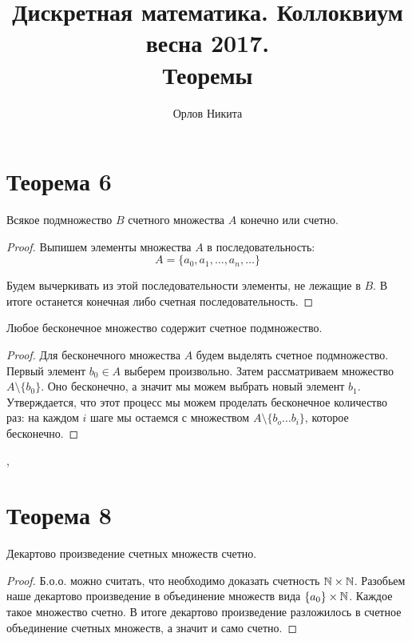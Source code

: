\documentclass[a4paper,12pt]{article}
\begin{document}
	\title{Дискретная математика. Коллоквиум весна 2017. \\ Теоремы}
	\author{Орлов Никита}
	\maketitle
	
	\section*{Теорема 6}
	\begin{theorem}
		Всякое подмножество $B$ счетного множества $A$ конечно или счетно.
	\end{theorem}
	\begin{proof}
		Выпишем элементы множества $A$ в последовательность:
		\[
		A = \{a_0, a_1, \ldots, a_n, \ldots \}
		\]
		
		Будем вычеркивать из этой последовательности элементы, не лежащие в $B$. В итоге останется конечная либо счетная последовательность. 
	\end{proof}

	\begin{theorem}
		Любое бесконечное множество содержит счетное подмножество.
	\end{theorem}
	\begin{proof}
		Для бесконечного множества $A$ будем выделять счетное подмножество. Первый элемент $b_0 \in A$ выберем произвольно. Затем рассматриваем множество $A \setminus \{b_0\}$. Оно бесконечно, а значит мы можем выбрать новый элемент $b_1$. Утверждается, что этот процесс мы можем проделать бесконечное количество раз: на каждом $i$ шаге мы остаемся с множеством $A \setminus \{b_o \ldots b_i\}$, которое бесконечно.
	\end{proof}
    
	\sep	
	
	
	\section*{Теорема 8}
	
	\begin{theorem}
		Декартово произведение счетных множеств счетно.
	\end{theorem}
	\begin{proof}
		Б.о.о. можно считать, что необходимо доказать счетность $\mathbb{N} \times \mathbb{N}$. Разобьем наше декартово произведение в объединение множеств вида $ \{a_0\} \times \mathbb{N} $. Каждое такое множество счетно. В итоге декартово произведение разложилось в счетное объединение счетных множеств, а значит и само счетно.
	\end{proof}
	
\end{document}
